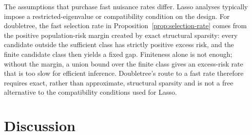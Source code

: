 \documentclass[12pt]{article}
\begin{document}
The assumptions that purchase fast nuisance rates differ. Lasso analyses typically impose a restricted-eigenvalue or compatibility condition on the design. For doubletree, the fast selection rate in Proposition~\ref{prop:selection-rate} comes from the positive population-risk margin created by exact structural sparsity: every candidate outside the sufficient class has strictly positive excess risk, and the finite candidate class then yields a fixed gap. Finiteness alone is not enough; without the margin, a union bound over the finite class gives an excess-risk rate that is too slow for efficient inference. Doubletree's route to a fast rate therefore requires exact, rather than approximate, structural sparsity and is not a free alternative to the compatibility conditions used for Lasso.

\section{Discussion}
\label{sec:discussion}
\end{document}
